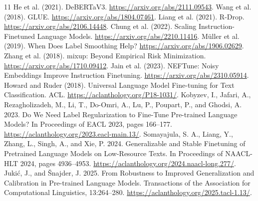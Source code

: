 \documentclass[letterpaper]{article}
\begin{document}
\begin{thebibliography}{11}
 He et al. (2021). DeBERTaV3. \url{https://arxiv.org/abs/2111.09543}.
 Wang et al. (2018). GLUE. \url{https://arxiv.org/abs/1804.07461}.
 Liang et al. (2021). R-Drop. \url{https://arxiv.org/abs/2106.14448}.
 Chung et al. (2022). Scaling Instruction-Finetuned Language Models. \url{https://arxiv.org/abs/2210.11416}.
 M\"uller et al. (2019). When Does Label Smoothing Help? \url{https://arxiv.org/abs/1906.02629}.
 Zhang et al. (2018). mixup: Beyond Empirical Risk Minimization. \url{https://arxiv.org/abs/1710.09412}.
 Jain et al. (2023). NEFTune: Noisy Embeddings Improve Instruction Finetuning. \url{https://arxiv.org/abs/2310.05914}.
 Howard and Ruder (2018). Universal Language Model Fine-tuning for Text Classification. ACL. \url{https://aclanthology.org/P18-1031/}.
 Kobyzev, I., Jafari, A., Rezagholizadeh, M., Li, T., Do-Omri, A., Lu, P., Poupart, P., and Ghodsi, A. 2023. Do We Need Label Regularization to Fine-Tune Pre-trained Language Models? In Proceedings of EACL 2023, pages 166--177. \url{https://aclanthology.org/2023.eacl-main.13/}.
 Somayajula, S. A., Liang, Y., Zhang, L., Singh, A., and Xie, P. 2024. Generalizable and Stable Finetuning of Pretrained Language Models on Low-Resource Texts. In Proceedings of NAACL-HLT 2024, pages 4936--4953. \url{https://aclanthology.org/2024.naacl-long.277/}.
 Juki\'c, J., and \v{S}najder, J. 2025. From Robustness to Improved Generalization and Calibration in Pre-trained Language Models. Transactions of the Association for Computational Linguistics, 13:264--280. \url{https://aclanthology.org/2025.tacl-1.13/}.
\end{thebibliography}
\end{document}
